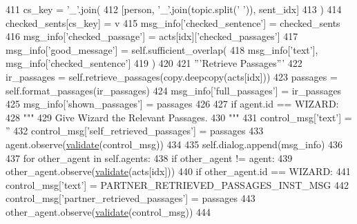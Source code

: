 \begin{DoxyCode}
411                         cs\_key = \textcolor{stringliteral}{'\_'}.join(
412                             [person, \textcolor{stringliteral}{'\_'}.join(topic.split(\textcolor{stringliteral}{' '})), sent\_idx]
413                         )
414                         checked\_sents[cs\_key] = v
415                 msg\_info[\textcolor{stringliteral}{'checked\_sentence'}] = checked\_sents
416                 msg\_info[\textcolor{stringliteral}{'checked\_passage'}] = acts[idx][\textcolor{stringliteral}{'checked\_passages'}]
417                 msg\_info[\textcolor{stringliteral}{'good\_message'}] = self.sufficient\_overlap(
418                     msg\_info[\textcolor{stringliteral}{'text'}], msg\_info[\textcolor{stringliteral}{'checked\_sentence'}]
419                 )
420 
421             \textcolor{stringliteral}{'''Retrieve Passages'''}
422             ir\_passages = self.retrieve\_passages(copy.deepcopy(acts[idx]))
423             passages = self.format\_passages(ir\_passages)
424             msg\_info[\textcolor{stringliteral}{'full\_passages'}] = ir\_passages
425             msg\_info[\textcolor{stringliteral}{'shown\_passages'}] = passages
426 
427             \textcolor{keywordflow}{if} agent.id == WIZARD:
428                 \textcolor{stringliteral}{"""}
429 \textcolor{stringliteral}{                Give Wizard the Relevant Passages.}
430 \textcolor{stringliteral}{                """}
431                 control\_msg[\textcolor{stringliteral}{'text'}] = \textcolor{stringliteral}{''}
432                 control\_msg[\textcolor{stringliteral}{'self\_retrieved\_passages'}] = passages
433                 agent.observe(\hyperlink{namespaceparlai_1_1core_1_1worlds_afc3fad603b7bce41dbdc9cdc04a9c794}{validate}(control\_msg))
434 
435             self.dialog.append(msg\_info)
436 
437             \textcolor{keywordflow}{for} other\_agent \textcolor{keywordflow}{in} self.agents:
438                 \textcolor{keywordflow}{if} other\_agent != agent:
439                     other\_agent.observe(\hyperlink{namespaceparlai_1_1core_1_1worlds_afc3fad603b7bce41dbdc9cdc04a9c794}{validate}(acts[idx]))
440                     \textcolor{keywordflow}{if} other\_agent.id == WIZARD:
441                         control\_msg[\textcolor{stringliteral}{'text'}] = PARTNER\_RETRIEVED\_PASSAGES\_INST\_MSG
442                         control\_msg[\textcolor{stringliteral}{'partner\_retrieved\_passages'}] = passages
443                         other\_agent.observe(\hyperlink{namespaceparlai_1_1core_1_1worlds_afc3fad603b7bce41dbdc9cdc04a9c794}{validate}(control\_msg))
444 
\end{DoxyCode}
